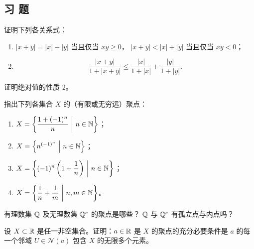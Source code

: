 \subsection{习 题}

\begin{exercise}
  \item 证明下列各关系式：
  \begin{enumerate}[label=\arabic*)]
    \item \(|x+y|=|x|+|y|\) 当且仅当 \(xy\geq0\)，
    \(|x+y|<|x|+|y|\) 当且仅当 \(xy<0\)；
    \item
    \[
    \frac{|x+y|}{1+|x+y|}
    \leq
    \frac{|x|}{1+|x|}+\frac{|y|}{1+|y|}.
    \]
  \end{enumerate}
\end{exercise}

\begin{exercise}
  \item 证明绝对值的性质 2。
\end{exercise}

\begin{exercise}
  \item 指出下列各集合 \(X\) 的（有限或无穷远）聚点：
  \begin{enumerate}[label=\arabic*)]
    \item \(\displaystyle X=\left\{\frac{1+(-1)^n}{n}\ \middle|\ n\in\mathbb{N}\right\}\)；
    \item \(\displaystyle X=\left\{n^{(-1)^n}\ \middle|\ n\in\N\right\}\)；
    \item \(\displaystyle X=\left\{(-1)^n\left(1+\frac1n\right)\ \middle|\ n\in\N\right\}\)；
    \item \(\displaystyle X=\left\{\frac1n+\frac1m\ \middle|\ n,m\in\mathbb{N}\right\}\)。
  \end{enumerate}
\end{exercise}

\begin{exercise}
  \item 有理数集 \(\mathbb{Q}\) 及无理数集 \(\mathbb{Q}^c\) 的聚点是哪些？
  \(\mathbb{Q}\) 与 \(\mathbb{Q}^c\) 有孤立点与内点吗？
\end{exercise}

\begin{exercise}
  \item 设 \(X\subset\mathbb{R}\) 是任一非空集合。证明：\(a\in\mathbb{R}\) 是 \(X\)
  的聚点的充分必要条件是 \(a\) 的每一个邻域 \(U\in\mathcal N(a)\)
  包含 \(X\) 的无限多个元素。
\end{exercise}

